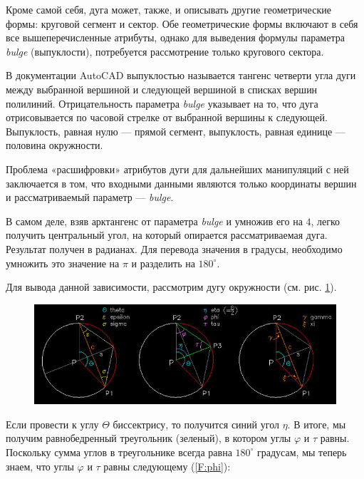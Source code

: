 Кроме самой себя, дуга может, также, и описывать другие геометрические формы: круговой сегмент и сектор. Обе геометрические формы включают в себя все вышеперечисленные атрибуты, однако для выведения формулы параметра \textit{bulge} (выпуклости), потребуется рассмотрение только кругового сектора.

В документации AutoCAD \cite{Autodesk} выпуклостью называется тангенс четверти угла дуги между выбранной вершиной и следующей вершиной в списках вершин полилиний. Отрицательность параметра \textit{bulge} указывает на то, что дуга отрисовывается по часовой стрелке от выбранной вершины к следующей. Выпуклость, равная нулю --- прямой сегмент, выпуклость, равная единице --- половина окружности.

Проблема «расшифровки» атрибутов дуги для дальнейших манипуляций с ней заключается в том, что входными данными являются только координаты вершин и рассматриваемый параметр --- \textit{bulge}.

В самом деле, взяв арктангенс от параметра \textit{bulge} и умножив его на $4$, легко получить центральный угол, на который опирается рассматриваемая дуга. Результат получен в радианах. Для перевода значения в градусы, необходимо умножить это значение на $\pi$ и разделить на $180^{\circ}$.

Для вывода данной зависимости, рассмотрим дугу окружности (см. рис. \ref{fig:arcchord}).

\begin{figure}[H]
	\centering
	\includegraphics[width=1.0\textwidth]{figures/arcchord.png}
	\label{fig:arcchord}
\end{figure}

Если провести к углу $\Theta$ биссектрису, то получится синий угол $\eta$. В итоге, мы получим равнобедренный треугольник (зеленый), в котором углы $\varphi$ и $\tau$ равны. Поскольку сумма углов в треугольнике всегда равна $180^{\circ}$ градусам, мы теперь знаем, что углы $\varphi$ и $\tau$ равны следующему (\ref{F:phi}):

